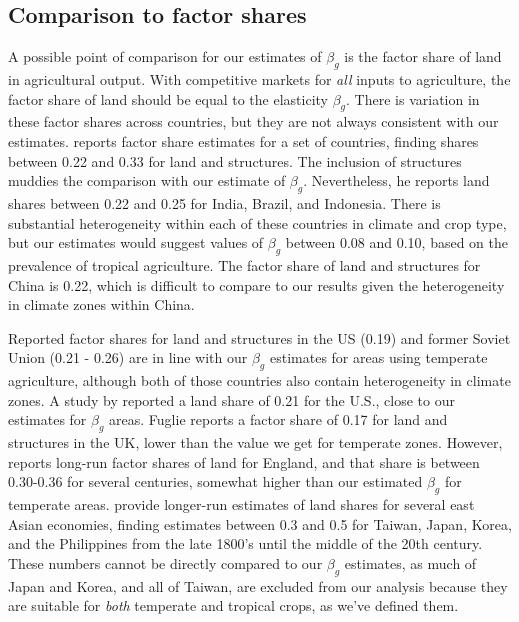 \documentclass[11pt]{article}
\begin{document}
\subsection{Comparison to factor shares}
A possible point of comparison for our estimates of $\beta_g$ is the factor share of land in agricultural output. With competitive markets for \textit{all} inputs to agriculture, the factor share of land should be equal to the elasticity $\beta_g$. There is variation in these factor shares across countries, but they are not always consistent with our estimates. \citet{fuglie2010} reports factor share estimates for a set of countries, finding shares between 0.22 and 0.33 for land and structures. The inclusion of structures muddies the comparison with our estimate of $\beta_g$. Nevertheless, he reports land shares between 0.22 and 0.25 for India, Brazil, and Indonesia. There is substantial heterogeneity within each of these countries in climate and crop type, but our estimates would suggest values of $\beta_g$ between 0.08 and 0.10, based on the prevalence of tropical agriculture. The factor share of land and structures for China is 0.22, which is difficult to compare to our results given the heterogeneity in climate zones within China.

Reported factor shares for land and structures in the US (0.19) and former Soviet Union (0.21 - 0.26) are in line with our $\beta_g$ estimates for areas using temperate agriculture, although both of those countries also contain heterogeneity in climate zones. A study by \citet{jg1992} reported a land share of 0.21 for the U.S., close to our estimates for $\beta_g$ areas. Fuglie reports a factor share of 0.17 for land and structures in the UK, lower than the value we get for temperate zones. However, \citet{Clark2002} reports long-run factor shares of land for England, and that share is between 0.30-0.36 for several centuries, somewhat higher than our estimated $\beta_g$ for temperate areas. \citet{hrs1979} provide longer-run estimates of land shares for several east Asian economies, finding estimates between 0.3 and 0.5 for Taiwan, Japan, Korea, and the Philippines from the late 1800's until the middle of the 20th century. These numbers cannot be directly compared to our $\beta_g$ estimates, as much of Japan and Korea, and all of Taiwan, are excluded from our analysis because they are suitable for \textit{both} temperate and tropical crops, as we've defined them. 
\end{document}
